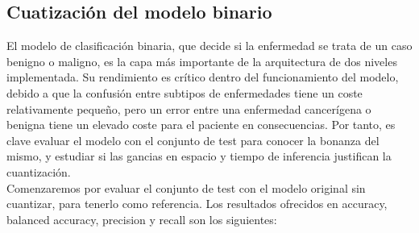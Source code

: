 \subsection{Cuatización del modelo binario}

El modelo de clasificación binaria, que decide si la enfermedad se trata de un caso benigno o maligno, es la capa más importante de la arquitectura de dos niveles implementada. Su rendimiento es crítico dentro del funcionamiento del modelo, debido a que la confusión entre subtipos de enfermedades tiene un coste relativamente pequeño, pero un error entre una enfermedad cancerígena o benigna tiene un elevado coste para el paciente en consecuencias. Por tanto, es clave evaluar el modelo con el conjunto de test para conocer la bonanza del mismo, y estudiar si las gancias en espacio y tiempo de inferencia justifican la cuantización.\\

Comenzaremos por evaluar el conjunto de test con el modelo original sin cuantizar, para tenerlo como referencia. Los resultados ofrecidos en accuracy, balanced accuracy, precision y recall son los siguientes:

